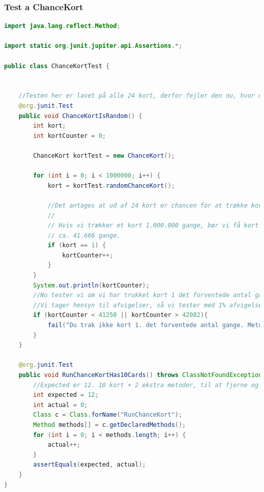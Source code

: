 \subsubsection{Test a ChanceKort}\label{ChanceKortTest}
\begin{lstlisting}[language=Java, caption=ChanceKort is random test]
import java.lang.reflect.Method;

import static org.junit.jupiter.api.Assertions.*;

public class ChanceKortTest {

    
    //Testen her er lavet på alle 24 kort, derfor fejler den nu, hvor der kun er 10 kort. Testen var en succes, da der var 24 kort. Dette ses også i rapporten.
    @org.junit.Test
    public void ChanceKortIsRandom() {
        int kort;
        int kortCounter = 0;

        ChanceKort kortTest = new ChanceKort();

        for (int i = 0; i < 1000000; i++) {
            kort = kortTest.randomChanceKort();

            //Det antages at ud af 24 kort er chancen for at trække kort 1. = 1/24
            //
            // Hvis vi trækker et kort 1.000.000 gange, bør vi få kort 1.
            // ca. 41.666 gange.
            if (kort == 1) {
                kortCounter++;
            }
        }
        System.out.println(kortCounter);
        //Nu tester vi om vi har trukket kort 1 det forventede antal gange
        //Vi tager hensyn til afvigelser, så vi tester med 1% afvigelse fra det forventede antal
        if (kortCounter < 41250 || kortCounter > 42082){
            fail("Du trak ikke kort 1. det forventede antal gange. Metoden er altså ikke tilfældig");
        }
    }

    @org.junit.Test
    public void RunChanceKortHas10Cards() throws ClassNotFoundException {
        //Expected er 12. 10 kort + 2 ekstra metoder, til at fjerne og tilføje biler.
        int expected = 12;
        int actual = 0;
        Class c = Class.forName("RunChanceKort");
        Method methods[] = c.getDeclaredMethods();
        for (int i = 0; i < methods.length; i++) {
            actual++;
        }
        assertEquals(expected, actual);
    }
}
\end{lstlisting}

